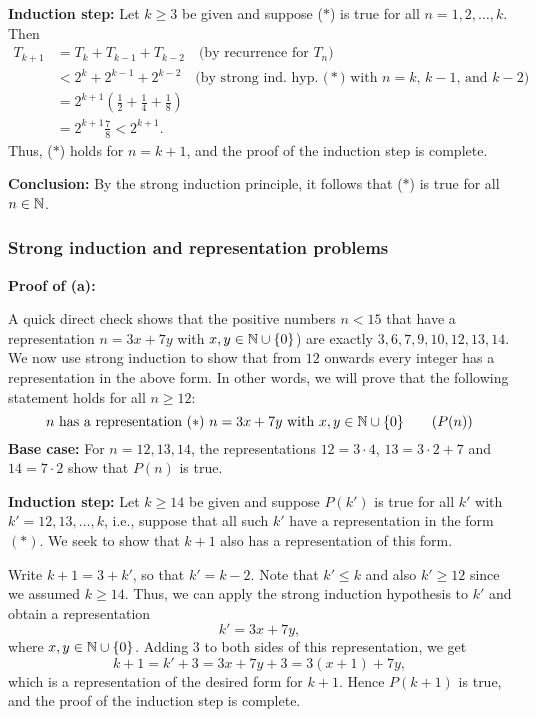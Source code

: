\textbf{Induction step:} Let $k\ge3$ be given and suppose 
($*$) is true for all $n=1,2,\dots,k$. Then
\begin{align*}
T_{k+1}&=T_{k}+T_{k-1}+T_{k-2}
\quad \text{(by recurrence for $T_n$)}
\\
&<2^{k}+2^{k-1}+2^{k-2} \quad \text{(by strong ind. hyp. ($*$)
with $n=k$, $k-1$, and $k-2$)}
\\
&=2^{k+1}\left(\frac12+\frac14+\frac18\right)
\\
&=2^{k+1}\frac{7}{8}
<2^{k+1}.
\end{align*}
Thus, ($*$) holds for $n=k+1$, and the proof of the induction step is complete. 

\textbf{Conclusion:} By the strong induction principle,  it follows that
($*$) is true for all $n\in\mathbb{N}$.  

\subsubsection{Strong induction and representation problems}

\textbf{Proof of (a):}

A quick direct check shows that the 
positive numbers $n<15$ that have a
representation $n=3x+7y$ with $x,y\in\mathbb{N}\cup \{0\}$) are exactly
$3,6,7,9,10,12,13,14$.  We now use strong induction to show that from
$12$ onwards every integer has a representation in the above form.
In other words, we will prove that the following 
statement holds for all $n\ge12$:
\[
\text{$n$ has a representation $(*)$ $n=3x+7y$ with $x,y\in\mathbb{N}\cup \{0\}$}
\tag{$P(n)$}
\]
\textbf{Base case:} For $n=12,13,14$, the representations $12=3\cdot 4$,
$13=3\cdot 2+7$ and $14=7\cdot 2$ show that $P(n)$ is true.

\textbf{Induction step:} 
Let $k\ge14$ be given and suppose $P(k')$ is true for all $k'$ with 
$k'=12,13,\dots,k$, i.e., suppose that all such $k'$ have a representation in
the form $(*)$. We seek to show that $k+1$ also has a representation of
this form. 

Write  $k+1=3+k'$, so that $k'=k-2$. Note that $k'\le k$ and  also
$k'\ge 12$ since we assumed $k\ge14$. Thus, we can apply the strong
induction hypothesis to $k'$ and obtain a representation 
\[
k'=3x+7y,
\]
where $x,y\in\mathbb{N}\cup\{0\}$. Adding $3$ to both sides of this
representation, we get
\[
k+1=k'+3= 3x+7y+3=3(x+1)+7y,
\]
which is a representation of the desired form for $k+1$.
Hence $P(k+1)$ is true, and the proof of the induction step is complete.

